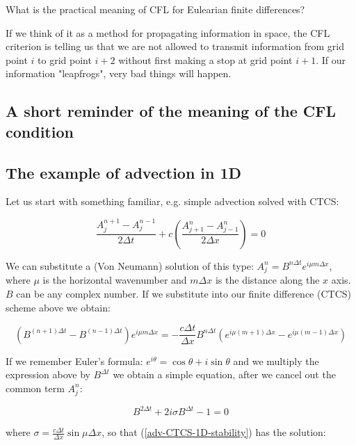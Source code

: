 What is the practical meaning of CFL for Eulearian finite differences?

If we think of it as a method for propagating information in space, the CFL criterion is telling us that we are not allowed to transmit information from grid point $i$ to grid point $i+2$ without first making a stop at grid point $i+1$.
If our information "leapfrogs", very bad things will happen.
	
\subsection{A short reminder of the meaning of the CFL condition}
\subsection{The example of advection in 1D}

	Let us start with something familiar, e.g. simple advection solved with CTCS:
	
	\begin{equation}
		\frac {A_j^{n+1}-A_j^{n-1}}{ 2 \Delta t} +c \left(  \frac {A_{j+1}^{n}-A_{j-1}^{n}}{ 2 \Delta x}  \right) = 0
		\label{adv-CTCS-1D}
	\end{equation}
	
	We can substitute a (Von Neumann) solution of this type: ${A_j^{n}=B^{n \Delta t} e^{i \mu m \Delta x}}$, where $\mu$ is the horizontal wavenumber and $m \Delta x$ is the distance along the $x$ axis. $B$ can be any complex number. If we substitute into our finite difference (CTCS) scheme above we obtain:
	
	\begin{equation}
		\left ( B^{(n+1)\Delta t}-B^{(n-1) \Delta t} \right ) e^{i \mu m \Delta x} = - \frac {c \Delta t}{\Delta x} B^{n \Delta t} \left( e^{i \mu (m+1) \Delta x}  - e^{i \mu (m-1) \Delta x}  \right)
		\label{adv-CTCS-1D-solution}
	\end{equation}
	
	If we remember Euler's formula: $e^{i \theta}=\cos \theta +i \sin \theta$ and we multiply the expression above by $B^{\Delta t}$ we obtain a simple equation, after we cancel out the common term $A_j^{n}$:
	
	\begin{equation}
		B^{2 \Delta t}    + 2 i \sigma B^{\Delta t}  -1 = 0  
		\label{adv-CTCS-1D-stability}
	\end{equation}
	
	where $\sigma = \frac {c \Delta t}{\Delta x} \sin \mu \Delta x$, so that (\ref{adv-CTCS-1D-stability}) has the solution:
	
